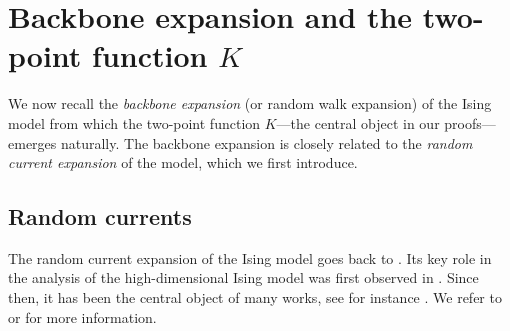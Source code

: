 \documentclass[10pt,a4paper]{amsart}
\numberwithin{equation}{section}
\begin{document}
\section{Backbone expansion and the two-point function $K$}\label{sec:backbone and stuff}

We now recall the \emph{backbone expansion} (or random walk expansion) of the Ising model from which the two-point function $K$---the central object in our proofs---emerges naturally. The backbone expansion is closely related to the \emph{random current expansion} of the model, which we first introduce.
\subsection{Random currents}
%
The random current expansion of the Ising model goes back to \cite{GriffithsHurstShermanConcavity1970}. Its key role in the analysis of the high-dimensional Ising model was first observed in \cite{AizenmanGeometricAnalysis1982}.  Since then, it has been the central object of many works, see for instance \cite{AizenmanGrahamRenormalizedCouplingSusceptibility4d1983,AizenmanFernandezCriticalBehaviorMagnetization1986,AizenmanBarskyFernandezSharpnessIsing1987,AizenmanDuminilSidoraviciusContinuityIsing2015,DuminilTassionNewProofSharpness2016,AizenmanDuminilTassionWarzelEmergentPlanarity2019,AizenmanDuminilTriviality2021,PanisTriviality2023,KrachunPanagiotisPanisScalinglimit2023,chen2023conformal,PanisIIC2024,DuminilPanis2024newLB,duminil2025conformal,LiuPanisSladePlateau,thinggaard2026end,hansen2026supercritical}. We refer to \cite{DuminilLecturesOnIsingandPottsModels2019} or \cite[Chapter~2]{Panis2024applications} for more information.
\end{document}
